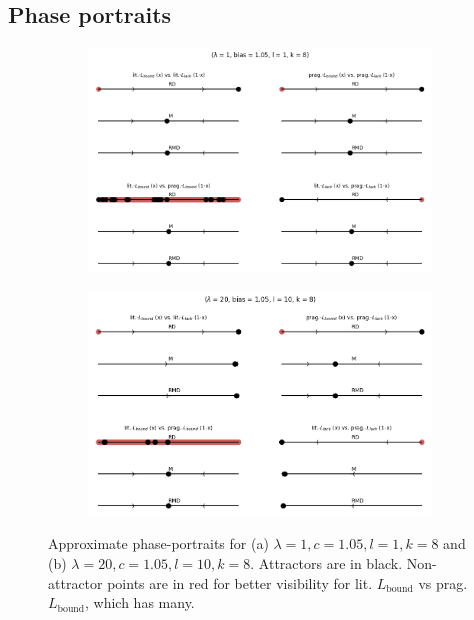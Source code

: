 \documentclass[fleqn,reqno,10pt]{article}
\newcommand{\mylang}[1]{\ensuremath{L_{\text{#1}}}\xspace} %
\newcommand{\Lbound}{\mylang{bound}}
\begin{document}
\subsection*{Phase portraits}
\begin{figure}
\centering
\begin{subfigure}{.6\textwidth}
  \centering
  \includegraphics[scale=0.3]{phases-lam01-bias105-l01-k8}
  \caption{}
  \label{fig:sub1}
\end{subfigure}%
\begin{subfigure}{.6\textwidth}
  \centering
  \includegraphics[scale=0.3]{phases-lam20-bias105-l10-k8}
  \caption{}
  \label{fig:sub2}
\end{subfigure}
\caption{Approximate phase-portraits for (a) $\lambda = 1, c = 1.05, l = 1, k = 8$ and (b) $\lambda = 20, c = 1.05, l =10, k =8$. Attractors are in black. Non-attractor points are in red for better visibility for lit. $\Lbound$ vs prag. $\Lbound$, which has many.}
\label{fig:phase}
\end{figure}
\end{document}
